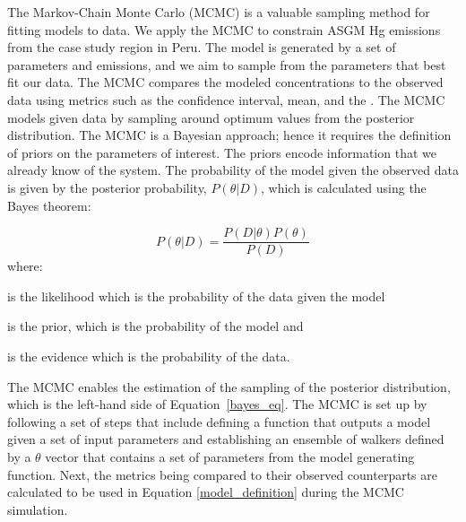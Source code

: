 \begin{flushleft}
The Markov-Chain Monte Carlo (MCMC) is a valuable sampling method for fitting models to data\cite{hogg_data_2018}. We apply the MCMC to constrain ASGM Hg emissions from the case study region in Peru.  The model is generated by a set of parameters and emissions, and we aim to sample from the parameters that best fit our data. The MCMC compares the modeled concentrations to the observed data using metrics such as the \nft confidence interval, mean, and the \iq. The MCMC models given data by sampling around optimum values from the posterior distribution. The MCMC is a Bayesian approach; hence it requires the definition of priors on the parameters of interest. The priors encode information that we already know of the system. The probability of the model given the observed data is given by the posterior probability, $P(\theta|D)$, which is calculated using the Bayes theorem:

\begin{equation}
\label{bayes_eq}
P(\theta|D)=\frac{P(D|\theta)P(\theta)}{P(D)}
\end{equation}
where:
\end{flushleft}

\begin{description}[leftmargin=!,labelwidth={3 em}]
    \item [$P(D|\theta)$] is the likelihood which is the probability of the data given the model
    \item [$P(\theta)$] is the prior, which is the probability of the model and 
    \item [$P(D)$] is the evidence which is the probability of the data.
\end{description}

\begin{flushleft}
The MCMC enables the estimation of the sampling of the posterior distribution, which is the left-hand side of Equation~\ref{bayes_eq}. The MCMC is set up by following a set of steps that include defining a function that outputs a model given a set of input parameters and establishing an ensemble of walkers defined by a $\theta$ vector that contains a set of parameters from the model generating function.
Next, the metrics being compared to their observed counterparts are calculated to be used in Equation \ref{model_definition} during the MCMC simulation. 
\end{flushleft}



